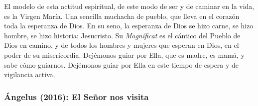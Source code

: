 \begin{body}
	El modelo de esta actitud espiritual, de este modo de ser y de caminar en la vida, es la Virgen María. Una sencilla muchacha de pueblo, que lleva en el corazón toda la esperanza de Dios. En su seno, la esperanza de Dios se hizo carne, se hizo hombre, se hizo historia: Jesucristo. Su \emph{Magníficat} es el cántico del Pueblo de Dios en camino, y de todos los hombres y mujeres que esperan en Dios, en el poder de su misericordia. Dejémonos guiar por Ella, que es madre, es mamá, y sabe cómo guiarnos. Dejémonos guiar por Ella en este tiempo de espera y de vigilancia activa.
\end{body}

\subsubsection{Ángelus (2016): El Señor nos visita}


